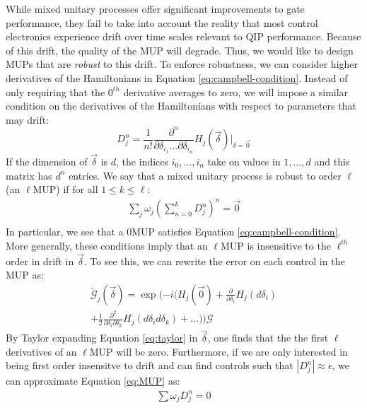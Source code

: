 \documentclass[aps,nofootinbib,pra,notitlepage,twocolumn]{revtex4-1}
\newcommand{\actual}{\ensuremath{\tilde{\mathcal{G}}}}
\newcommand{\target}{\ensuremath{{\mathcal{G}}}}
\begin{document}
While mixed unitary processes offer significant improvements to gate performance, they fail to take into account the reality that most control electronics experience drift over time scales relevant to QIP performance. Because of this drift, the quality of the MUP will degrade. Thus, we would like to design MUPs that are \textit{robust} to this drift. To enforce robustness, we can consider higher derivatives of the Hamiltonians in Equation \ref{eq:campbell-condition}. Instead of only requiring that the $0^{th}$ derivative averages to zero, we will impose a similar condition on the derivatives of the Hamiltonians with respect to parameters that may drift:
\begin{equation}
D^n_j = \frac{1}{n!}\frac{\partial^{n}}{\partial\delta_{i_1}\ldots\partial\delta_{i_n}}H_j(\vec{\delta})|_{\delta=\vec{0}}
\end{equation}
If the dimension of $\vec{\delta}$ is $d$, the indices $i_0, \ldots, i_n$ take on values in $1, \ldots, d$ and this matrix has $d^n$ entries. 
We say that a mixed unitary process is robust to order $\ell$ (an $\ell$MUP) if for all $1 \leq k \leq \ell$:
\begin{equation}\label{eq:MUP}
\begin{gathered}
\sum_j\omega_j(\sum_{n=0}^k D^n_j)^n = \vec{0}\\
\end{gathered}
\end{equation}
In particular, we see that a 0MUP satisfies Equation \ref{eq:campbell-condition}. More generally, these conditions imply that an $\ell$MUP is insensitive to the $\ell^{th}$ order in drift in $\vec{\delta}$. To see this, we can rewrite the error on each control in the MUP as:
\begin{equation}\label{eq:taylor}
\begin{gathered}
\actual_j(\vec{\delta}) = \exp(-i(H_j(\vec{0}) + \frac{\partial}{\partial\delta_i}H_j(d\delta_i)\\ +  \frac{1}{2}\frac{\partial^2}{\partial\delta_i\partial\delta_k} H_j(d\delta_i d\delta_k) + \ldots))\target
\end{gathered}
\end{equation}
By Taylor expanding Equation \ref{eq:taylor} in $\vec{\delta}$, one finds that the the first $\ell$ derivatives of an $\ell$MUP will be zero. Furthermore, if we are only interested in being first order insensitve to drift and can find controls such that $|D_j^n|\approx\epsilon$, we can approximate Equation \ref{eq:MUP} as:
\begin{equation}\label{eq:MUP-relaxed}
\begin{gathered}
\sum\omega_jD^n_j = 0\\
\end{gathered}
\end{equation}
\end{document}
